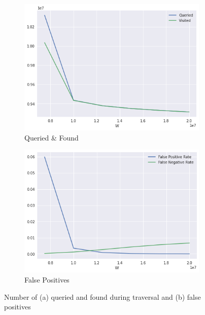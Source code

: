 \begin{figure}[htbp]
	\centering
    \begin{subfigure}{.5\textwidth}
        \centering
        \includegraphics[width=\textwidth]{figures/e_coli-dbcm-queried_and_found-K31-D8-T40}
        \caption{Queried \& Found}\label{fig:ecoli-art-traversal-W-queriedfound}
    \end{subfigure}%
    \begin{subfigure}{.5\textwidth}
        \centering
        \includegraphics[width=\textwidth]{figures/e_coli-dbcm-false_positive_and_negative_rates-K31-D8-T40}
        \caption{False Positives}\label{fig:ecoli-art-traversal-W-fpfn}
    \end{subfigure}
	\caption{Number of (a)  queried and found during traversal and (b) false positives}\label{fig:ecoli-art-traversal-W}
\end{figure}

